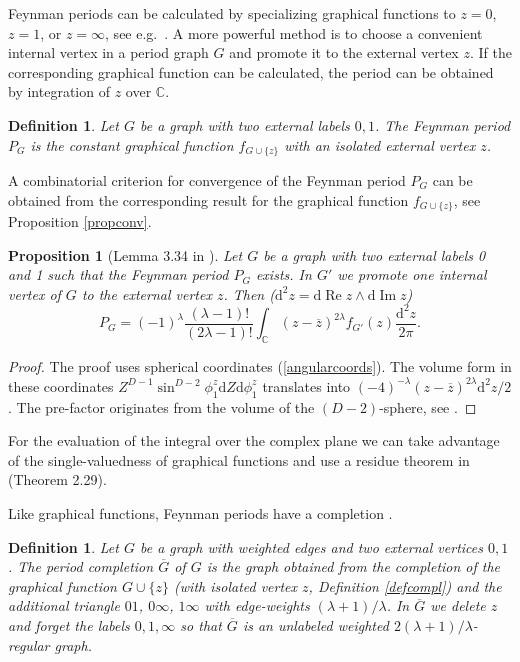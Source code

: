 \documentclass[oneside]{amsart}
\newcommand{\CC}{{\mathbb C}}
\newcommand{\dd}{\mathrm{d}}
\newcommand{\zz}{{\overline{z}}}
\newcommand{\Gg}{{\overline{G}}}
\renewcommand{\Im}{\mathop\mathrm{Im}}
\renewcommand{\Re}{\mathop\mathrm{Re}}
\theoremstyle{plain}
\newtheorem{prop}[thm]{Proposition}
\newtheorem{defn}[thm]{Definition}
\begin{document}
Feynman periods can be calculated by specializing graphical functions to $z=0$, $z=1$, or $z=\infty$, see e.g.\ \cite{ZZ}.
A more powerful method is to choose a convenient internal vertex in a period graph $G$ and promote it to the external vertex $z$. If the corresponding
graphical function can be calculated, the period can be obtained by integration of $z$ over $\CC$.

\begin{defn}
Let $G$ be a graph with two external labels $0,1$. The Feynman period $P_G$ is the constant graphical function $f_{G\cup\{z\}}$ with an isolated external vertex $z$.
\end{defn}

A combinatorial criterion for convergence of the Feynman period $P_G$ can be obtained from the corresponding result for the graphical function $f_{G\cup\{z\}}$, see Proposition \ref{propconv}.

\begin{prop}[Lemma 3.34 in \cite{gf}]
Let $G$ be a graph with two external labels 0 and 1 such that the Feynman period $P_G$ exists. In $G'$ we promote one internal vertex of $G$
to the external vertex $z$. Then ($\dd^2 z=\dd\Re z\wedge\dd\Im z$)
\begin{equation}\label{PGint}
P_G=(-1)^\lambda\frac{(\lambda-1)!}{(2\lambda-1)!}\int_\CC(z-\zz)^{2\lambda}f_{G'}(z)\frac{\dd^2 z}{2\pi}.
\end{equation}
\end{prop}
\begin{proof}
The proof uses spherical coordinates (\ref{angularcoords}). The volume form in these coordinates $Z^{D-1}\sin^{D-2}\phi^z_1\dd Z\dd\phi^z_1$ translates into $(-4)^{-\lambda}(z-\zz)^{2\lambda}\dd^2z/2$.
The pre-factor originates from the volume of the $(D-2)$-sphere, see \cite{gf}.
\end{proof}
For the evaluation of the integral over the complex plane we can take advantage of the single-valuedness of graphical functions
and use a residue theorem in \cite{gf} (Theorem 2.29).

Like graphical functions, Feynman periods have a completion \cite{Census}.
\begin{defn}\label{defperiodcompl}
Let $G$ be a graph with weighted edges and two external vertices $0,1$. The period completion $\Gg$ of $G$ is the graph obtained from the completion of the graphical function
$G\cup\{z\}$ (with isolated vertex $z$, Definition \ref{defcompl}) and the additional triangle $01$, $0\infty$, $1\infty$ with edge-weights $(\lambda+1)/\lambda$.
In $\Gg$ we delete $z$ and forget the labels $0,1,\infty$ so that $\Gg$ is an unlabeled weighted $2(\lambda+1)/\lambda$-regular graph.
\end{defn}
\end{document}
